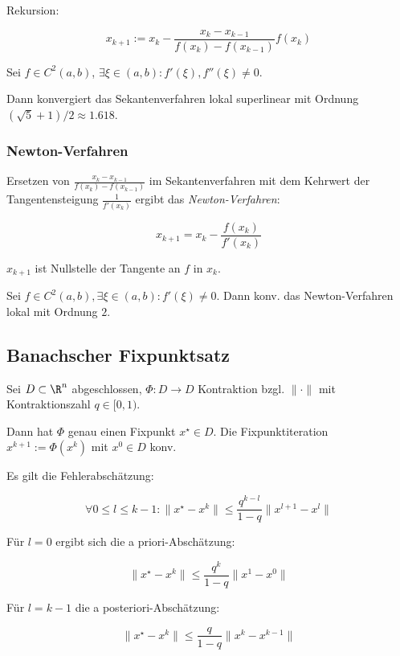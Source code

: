 Rekursion:

\vspace*{-4mm}
\[ x_{k+1} := x_k - \frac{x_k-x_{k-1}}{f(x_k)-f(x_{k-1})}f(x_k) \]

\spacing

Sei $f \in C^2(a,b)$, $\exists \xi \in (a,b) : f'(\xi), f''(\xi) \neq 0$.

Dann konvergiert das Sekantenverfahren lokal superlinear mit Ordnung $(\sqrt{5}+1)/2 \approx 1.618$.

\subsubsection*{Newton-Verfahren}

Ersetzen von $\frac{x_k-x_{k-1}}{f(x_k)-f(x_{k-1})}$ im Sekantenverfahren mit dem Kehrwert der Tangentensteigung $\frac{1}{f'(x_k)}$ ergibt das \emph{Newton-Verfahren}:

\vspace*{-2mm}
\[ x_{k+1} = x_k - \frac{f(x_k)}{f'(x_k)} \]

$x_{k+1}$ ist Nullstelle der Tangente an $f$ in $x_k$.

\spacing

Sei $f \in C^2(a,b), \exists \xi \in (a,b) : f'(\xi) \neq 0$. Dann konv. das Newton-Verfahren lokal mit Ordnung $2$.

\subsection*{Banachscher Fixpunktsatz}

Sei $D \subset \R^n$ abgeschlossen, $\Phi : D \to D$ Kontraktion bzgl. $\|\cdot\|$ mit Kontraktionszahl $q \in [0,1)$.

Dann hat $\Phi$ genau einen Fixpunkt $x^\star \in D$. Die Fixpunktiteration $x^{k+1} := \Phi(x^k)$ mit $x^0 \in D$ konv.

Es gilt die Fehlerabschätzung:

\vspace*{-6mm}
\[ \forall 0 \leq l \leq k - 1 : \|x^\star - x^k\| \leq \frac{q^{k-l}}{1-q} \|x^{l+1} - x^l\| \]

Für $l=0$ ergibt sich die a priori-Abschätzung:

\vspace*{-2mm}
\[ \|x^\star - x^k\| \leq \frac{q^k}{1-q} \|x^1 - x^0\| \]

Für $l=k-1$ die a posteriori-Abschätzung:

\vspace*{-2mm}
\[ \|x^\star - x^k\| \leq \frac{q}{1-q} \|x^k - x^{k-1}\| \]

